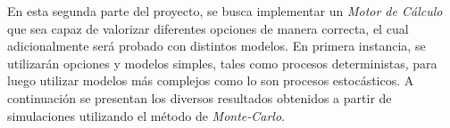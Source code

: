 \noindent En esta segunda parte del proyecto, se busca implementar un \textit{Motor de Cálculo} que sea capaz de valorizar diferentes opciones de manera correcta, el cual adicionalmente será probado con distintos modelos. En primera instancia, se utilizarán opciones y modelos simples, tales como procesos deterministas, para luego utilizar modelos más complejos como lo son procesos estocásticos. A continuación se presentan los diversos resultados obtenidos a partir de simulaciones utilizando el método de \textit{Monte-Carlo}.
